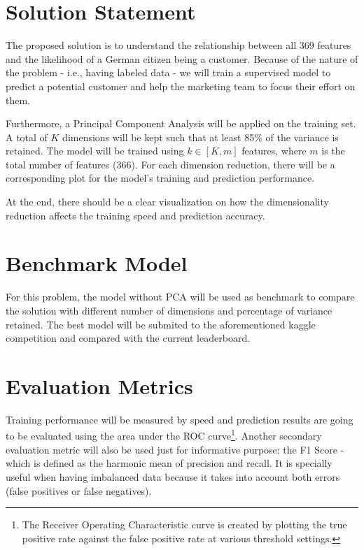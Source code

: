 \documentclass[10pt,twoside,twocolumn,nofonttune,a4paper,journal,compsoc,english,french,spanish]{IEEEtran}
\begin{document}
\hypertarget{solution-statement}{%
\section{Solution Statement}\label{solution-statement}}

The proposed solution is to understand the relationship between all 369
features and the likelihood of a German citizen being a customer.
Because of the nature of the problem - i.e., having labeled data - we
will train a supervised model to predict a potential customer and help
the marketing team to focus their effort on them.

Furthermore, a Principal Component Analysis will be applied on the
training set. A total of \(K\) dimensions will be kept such that at
least 85\% of the variance is retained. The model will be trained using
\(k \in \left[K,m\right]\) features, where \(m\) is the total number of
features (366). For each dimension reduction, there will be a
corresponding plot for the model's training and prediction performance.

At the end, there should be a clear visualization on how the
dimensionality reduction affects the training speed and prediction
accuracy.

\hypertarget{benchmark-model}{%
\section{Benchmark Model}\label{benchmark-model}}

For this problem, the model without PCA will be used as benchmark to
compare the solution with different number of dimensions and percentage
of variance retained. The best model will be submited to the
aforementioned kaggle competition and compared with the current
leaderboard.

\hypertarget{evaluation-metrics}{%
\section{Evaluation Metrics}\label{evaluation-metrics}}

Training performance will be measured by speed and prediction results
are going to be evaluated using the area under the ROC curve\footnote{The
  Receiver Operating Characteristic curve is created by plotting the
  true positive rate against the false positive rate at various
  threshold settings.}. Another secondary evaluation metric will also be
used just for informative purpose: the F1 Score - which is defined as
the harmonic mean of precision and recall. It is specially useful when
having imbalanced data because it takes into account both errors (false
positives or false negatives)\cite{Korstanje2021F1Score}.
\end{document}

